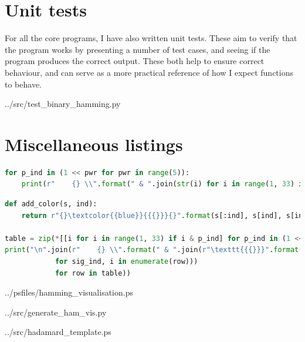 \documentclass{article}
\begin{document}
    \section{Unit tests}

    For all the core programs, I have also written unit tests. These aim to
    verify that the program works by presenting a number of test cases, and
    seeing if the program produces the correct output. These both help to ensure
    correct behaviour, and can serve as a more practical reference of how I
    expect functions to behave.


{../src/test_binary_hamming.py}

    \section{Miscellaneous listings}

\begin{lstlisting}[language=Python, caption=Generating Hamming coverage indices,
                   label=lst:hamtab]
for p_ind in (1 << pwr for pwr in range(5)):
    print(r"    {} \\".format(" & ".join(str(i) for i in range(1, 33) if i & p_ind)))
\end{lstlisting}

\begin{lstlisting}[language=Python, caption=Generating binary table,
                   label={lst:hamcol}]
def add_color(s, ind):
    return r"{}\textcolor{{blue}}{{{}}}{}".format(s[:ind], s[ind], s[ind+1:])

table = zip(*[[i for i in range(1, 33) if i & p_ind] for p_ind in (1 << pwr for pwr in range(5))])
print("\n".join(r"    {} \\".format(" & ".join(r"\texttt{{{}}}".format(add_color(bin(i)[2:].rjust(5, "0"), 4 -sig_ind))
            for sig_ind, i in enumerate(row)))
            for row in table))
\end{lstlisting}


{../psfiles/hamming_visualisation.ps}


{../src/generate_ham_vis.py}


{../src/hadamard_template.ps}
\end{document}
